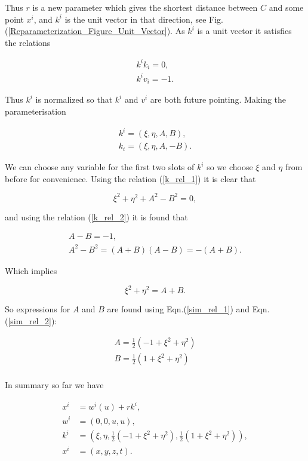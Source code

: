 \noindent Thus $r$ is a new parameter which gives the shortest distance between $C$ and some point $x^i$, and $k^i$ is the unit vector in that direction, see Fig.(\ref{Reparameterization_Figure_Unit_Vector}). As $k^i$ is a unit vector it satisfies the relations

\begin{gather}
k^i k_i = 0 \label{k_rel_1},\\
k^i v_i = -1 \label{k_rel_2}.
\end{gather}

\noindent Thus $k^i$ is normalized so that $k^i$ and $v^i$ are both future pointing. Making the parameterisation

\begin{gather*}
k^i = (\xi, \eta, A, B), \\
k_i = (\xi, \eta, A, -B).
\end{gather*}

\noindent We can choose any variable for the first two slots of $k^i$ so we choose $\xi$ and $\eta$ from before for convenience. Using the relation (\ref{k_rel_1}) it is clear that

\begin{equation*}
\xi^2 + \eta^2 + A^2 - B^2 = 0,
\end{equation*}

\noindent and using the relation (\ref{k_rel_2}) it is found that

\begin{gather}
A - B = -1 \label{sim_rel_1},\\
A^2 - B^2 = (A + B)(A - B) = - (A + B).
\end{gather}

\noindent Which implies

\begin{equation}\label{sim_rel_2}
\xi^2 + \eta^2 = A + B. 
\end{equation}

\noindent So expressions for $A$ and $B$ are found using Eqn.(\ref{sim_rel_1}) and Eqn.(\ref{sim_rel_2}):

\begin{eqnarray*}
A = \frac{1}{2} (-1 + \xi^2 + \eta^2) \\
B = \frac{1}{2} (1 + \xi^2 + \eta^2) \\
\end{eqnarray*}

In summary so far we have

\begin{align}
x^i & = w^i (u) + r k^i \label{rel_for_trans_1},\\
w^i & = (0,0, u,u) \label{rel_for_trans_2},\\
k^i & = (\xi, \eta, \frac{1}{2} (-1 + \xi^2 + \eta^2), \frac{1}{2} (1 + \xi^2 + \eta^2)) \label{rel_for_trans_3},\\
x^i & = (x, y, z, t) \label{rel_for_trans_4}.  
\end{align}

